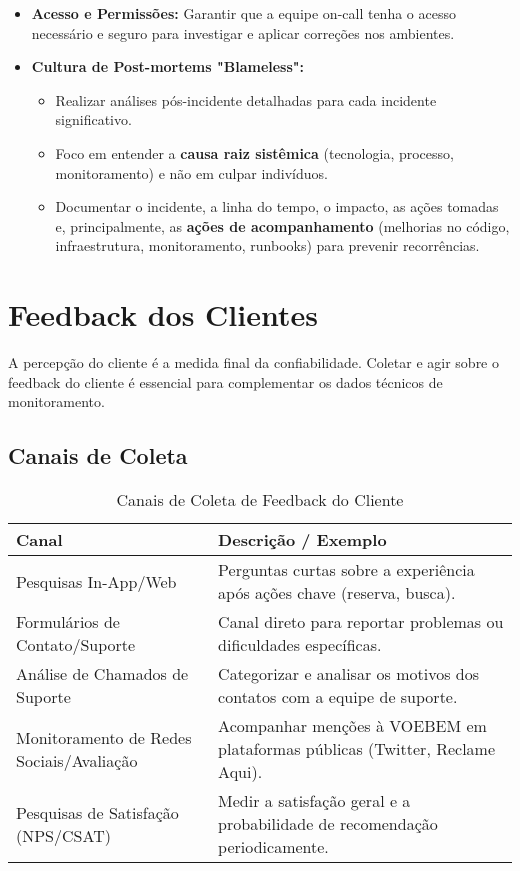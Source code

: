 \begin{itemize}
\begin{itemize}
            \item \textbf{Acesso e Permissões:} Garantir que a equipe on-call tenha o acesso necessário e seguro para investigar e aplicar correções nos ambientes.
            \item \textbf{Cultura de Post-mortems "Blameless":}
                \begin{itemize}
                    \item Realizar análises pós-incidente detalhadas para cada incidente significativo.
                    \item Foco em entender a \textbf{causa raiz sistêmica} (tecnologia, processo, monitoramento) e não em culpar indivíduos.
                    \item Documentar o incidente, a linha do tempo, o impacto, as ações tomadas e, principalmente, as \textbf{ações de acompanhamento} (melhorias no código, infraestrutura, monitoramento, runbooks) para prevenir recorrências.
                \end{itemize}
        \end{itemize}
\end{itemize}

\section{Feedback dos Clientes}
\label{sec:feedback-clientes}

A percepção do cliente é a medida final da confiabilidade. Coletar e agir sobre o feedback do cliente é essencial para complementar os dados técnicos de monitoramento.

\subsection{Canais de Coleta}
\label{subsec:canais-coleta}

\begin{table}[htbp]
    \centering
    \caption{Canais de Coleta de Feedback do Cliente}
    \label{tab:canais-coleta}
    \begin{tabularx}{\textwidth}{lX} %
        \toprule
        \textbf{Canal} & \textbf{Descrição / Exemplo} \\
        \midrule
        Pesquisas In-App/Web & Perguntas curtas sobre a experiência após ações chave (reserva, busca). \\
        Formulários de Contato/Suporte & Canal direto para reportar problemas ou dificuldades específicas. \\
        Análise de Chamados de Suporte & Categorizar e analisar os motivos dos contatos com a equipe de suporte. \\
        Monitoramento de Redes Sociais/Avaliação & Acompanhar menções à VOEBEM em plataformas públicas (Twitter, Reclame Aqui). \\
        Pesquisas de Satisfação (NPS/CSAT) & Medir a satisfação geral e a probabilidade de recomendação periodicamente. \\
        \bottomrule
    \end{tabularx}
\end{table}


